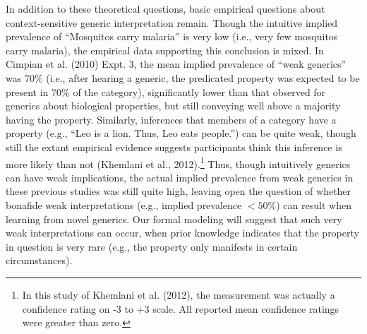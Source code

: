 \documentclass[floatsintext,doc]{apa6}
\let\rmarkdownfootnote\footnote%
\def\footnote{\protect\rmarkdownfootnote}
\begin{document}
In addition to these theoretical questions, basic empirical questions about context-sensitive generic interpretation remain.
Though the intuitive implied prevalence of \enquote{Mosquitos carry malaria} is very low (i.e., very few mosquitos carry malaria), the empirical data supporting this conclusion is mixed.
In Cimpian et al. (2010) Expt. 3, the mean implied prevalence of \enquote{weak generics} was \(70\%\) (i.e., after hearing a generic, the predicated property was expected to be present in 70\% of the category), significantly lower than that observed for generics about biological properties, but still conveying well above a majority having the property.
Similarly, inferences that members of a category have a property (e.g., \enquote{Leo is a lion. Thus, Leo eats people.}) can be quite weak, though still the extant empirical evidence suggests participants think this inference is more likely than not (Khemlani et al., 2012).\footnote{In this study of Khemlani et al. (2012), the measurement was actually a confidence rating on -3 to +3 scale. All reported mean confidence ratings were greater than zero. }
Thus, though intuitively generics can have weak implications, the actual implied prevalence from weak generics in these previous studies was still quite high, leaving open the question of whether bonafide weak interpretations (e.g., implied prevalence \(<50\%\)) can result when learning from novel generics.
Our formal modeling will suggest that such very weak interpretations can occur, when prior knowledge indicates that the property in question is very rare (e.g., the property only manifests in certain circumstances).
\end{document}
